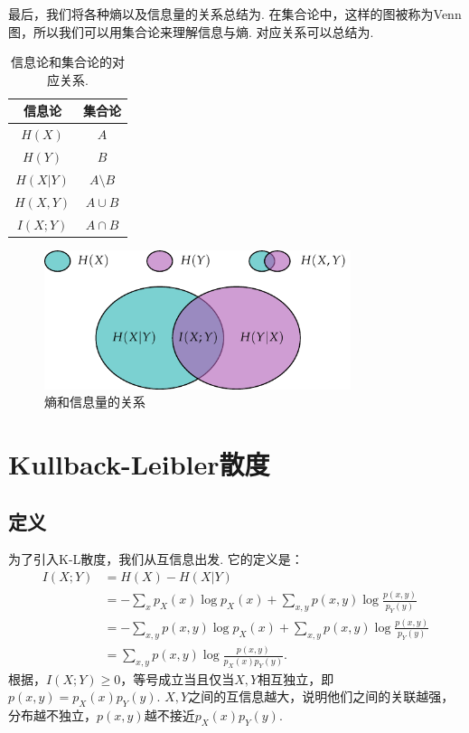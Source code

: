 最后，我们将各种熵以及信息量的关系总结为. 在集合论中，这样的图被称为Venn图，所以我们可以用集合论来理解信息与熵. 对应关系可以总结为.
\begin{table}[ht]
    \centering
        \begin{tabular}{c|c}
        \toprule
        信息论&集合论\\
        \midrule
        $H(X)$&$A$\\
        $H(Y)$&$B$\\
        $H(X|Y)$&$A\setminus B$\\
        $H(X,Y)$&$A\cup B$\\
        $I(X;Y)$&$A\cap B$\\
        \bottomrule
        \end{tabular}
    \caption{信息论和集合论的对应关系.}
    \label{tab:entropy-relation}
\end{table}
\begin{figure}[ht]
    \centering
    \includegraphics[width=0.8\textwidth]{figures/information-theory/entropy-relations.pdf}
    \caption{熵和信息量的关系}
    \label{fig:entropy-relation}
\end{figure}

\section{Kullback-Leibler散度}\label{sec:kl-divergence}
\subsection{定义}
为了引入K-L散度，我们从互信息出发. 它的定义是：
\begin{align*}
    I(X;Y)&=H(X)-H(X|Y)\\
    &=-\sum_{x}p_X(x)\log p_X(x)+\sum_{x,y}p(x,y)\log\frac{p(x,y)}{p_Y(y)}\\
    &=-\sum_{x,y}p(x,y)\log p_X(x)+\sum_{x,y}p(x,y)\log\frac{p(x,y)}{p_Y(y)}\\
    &=\sum_{x,y}p(x,y)\log\frac{p(x,y)}{p_X(x)p_Y(y)}.
\end{align*}
根据，$I(X;Y)\geq 0$，等号成立当且仅当$X,Y$相互独立，即$p(x,y)=p_X(x)p_Y(y)$. $X,Y$之间的互信息越大，说明他们之间的关联越强，分布越不独立，$p(x,y)$越不接近$p_X(x)p_Y(y)$. 


